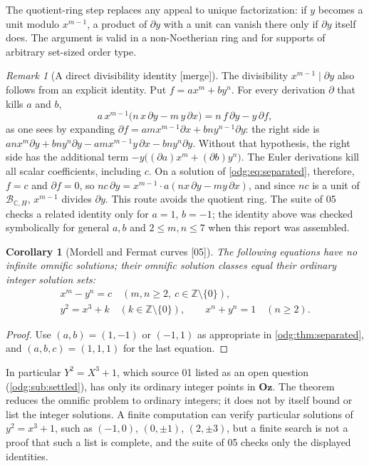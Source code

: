 \documentclass[11pt,oneside]{article}
\numberwithin{equation}{section}
\newtheorem{corollary}[corollary]{Corollary}
\theoremstyle{definition}
\theoremstyle{remark}
\newtheorem{remark}[remark]{Remark}
\newcommand{\Oz}{\mathbf{Oz}}
\newcommand{\Z}{\mathbb Z}
\newcommand{\C}{\mathbb C}
\newcommand{\src}[1]{\textup{\textsf{\small[#1]}}}
\newcommand{\mergetag}{\textup{\textsf{\small[merge]}}}
\begin{document}
The quotient-ring step replaces any appeal to unique factorization: if $y$
becomes a unit modulo $x^{m-1}$, a product of $\partial y$ with a unit can
vanish there only if $\partial y$ itself does. The argument is valid in a
non-Noetherian ring and for supports of arbitrary set-sized order type.

\begin{remark}[A direct divisibility identity \mergetag]\label{odg:rem:separatedidentity}
The divisibility $x^{m-1}\mid\partial y$ also follows from an explicit
identity. Put $f=ax^m+by^n$. For every derivation $\partial$ that kills
$a$ and $b$,
\[
 a\,x^{m-1}\bigl(n\,x\,\partial y-m\,y\,\partial x\bigr)
 =n\,f\,\partial y-y\,\partial f,
\]
as one sees by expanding
$\partial f=amx^{m-1}\partial x+bny^{n-1}\partial y$: the right side is
$anx^m\partial y+bny^n\partial y-amx^{m-1}y\,\partial x-bny^{n}\partial y$.
Without that hypothesis, the right side has the additional term
$-y\bigl((\partial a)x^m+(\partial b)y^n\bigr)$. The Euler derivations kill
all scalar coefficients, including $c$. On a solution of
\eqref{odg:eq:separated}, therefore, $f=c$ and $\partial f=0$, so
$nc\,\partial y=x^{m-1}\cdot a(nx\,\partial y-my\,\partial x)$, and since $nc$
is a unit of $\mathcal B_{\C,H}$, $x^{m-1}$ divides $\partial y$. This route
avoids the quotient ring. The suite of 05 checks a related identity only
for $a=1$, $b=-1$; the identity above was checked symbolically for general
$a,b$ and $2\le m,n\le7$ when this report was assembled.
\end{remark}

\begin{corollary}[Mordell and Fermat curves \src{05}]\label{odg:cor:mordell}
The following equations have no infinite omnific solutions; their omnific
solution classes equal their ordinary integer solution sets:
\begin{gather*}
 x^m-y^n=c\quad(m,n\ge2,\ c\in\Z\setminus\{0\}),\\
 y^2=x^3+k\quad(k\in\Z\setminus\{0\}),\qquad
 x^n+y^n=1\quad(n\ge2).
\end{gather*}
\end{corollary}
\begin{proof}
Use $(a,b)=(1,-1)$ or $(-1,1)$ as appropriate in
\cref{odg:thm:separated}, and $(a,b,c)=(1,1,1)$ for the last equation.
\end{proof}

In particular $Y^2=X^3+1$, which source 01 listed as an open question
(\cref{odg:sub:settled}), has only its ordinary integer points in $\Oz$. The
theorem reduces the omnific problem to ordinary integers; it does not by
itself bound or list the integer solutions. A finite computation can verify
particular solutions of $y^2=x^3+1$, such as $(-1,0)$, $(0,\pm1)$, $(2,\pm3)$,
but a finite search is not a proof that such a list is complete, and the
suite of 05 checks only the displayed identities.
\end{document}
